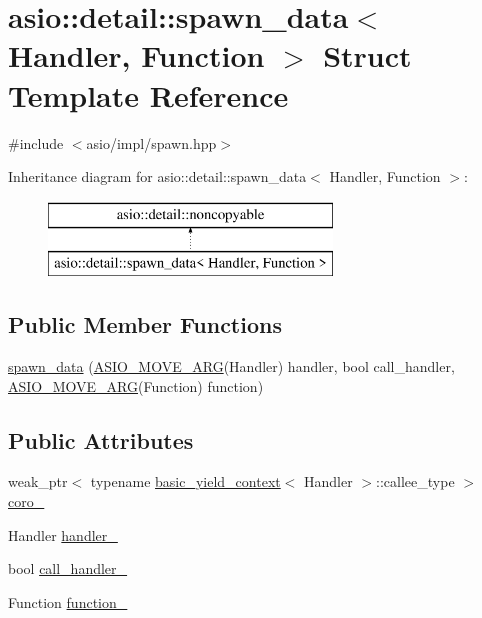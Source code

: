 \hypertarget{structasio_1_1detail_1_1spawn__data}{}\section{asio\+:\+:detail\+:\+:spawn\+\_\+data$<$ Handler, Function $>$ Struct Template Reference}
\label{structasio_1_1detail_1_1spawn__data}


{\ttfamily \#include $<$asio/impl/spawn.\+hpp$>$}

Inheritance diagram for asio\+:\+:detail\+:\+:spawn\+\_\+data$<$ Handler, Function $>$\+:\begin{figure}[H]
\begin{center}
\leavevmode
\includegraphics[height=2.000000cm]{structasio_1_1detail_1_1spawn__data}
\end{center}
\end{figure}
\subsection*{Public Member Functions}
\begin{DoxyCompactItemize}
\item 
\hyperlink{structasio_1_1detail_1_1spawn__data_a2b3cea5dc331b9c858483cbbf291cebd}{spawn\+\_\+data} (\hyperlink{group__async__read_ga6d72a97784dde9476c6d93b8904a4967}{A\+S\+I\+O\+\_\+\+M\+O\+V\+E\+\_\+\+A\+R\+G}(Handler) handler, bool call\+\_\+handler, \hyperlink{group__async__read_ga6d72a97784dde9476c6d93b8904a4967}{A\+S\+I\+O\+\_\+\+M\+O\+V\+E\+\_\+\+A\+R\+G}(Function) function)
\end{DoxyCompactItemize}
\subsection*{Public Attributes}
\begin{DoxyCompactItemize}
\item 
weak\+\_\+ptr$<$ typename \hyperlink{classasio_1_1basic__yield__context}{basic\+\_\+yield\+\_\+context}$<$ Handler $>$\+::callee\+\_\+type $>$ \hyperlink{structasio_1_1detail_1_1spawn__data_a3d0b86a01a51c2dd0a92cf4dfedd4ce0}{coro\+\_\+}
\item 
Handler \hyperlink{structasio_1_1detail_1_1spawn__data_a9450f8cd517de26ccb775cdd8f0254e9}{handler\+\_\+}
\item 
bool \hyperlink{structasio_1_1detail_1_1spawn__data_abb8049886da1a441474507f6790c3f14}{call\+\_\+handler\+\_\+}
\item 
Function \hyperlink{structasio_1_1detail_1_1spawn__data_ab2f73b1edf9593c3f9eb72c80d5446a2}{function\+\_\+}
\end{DoxyCompactItemize}



